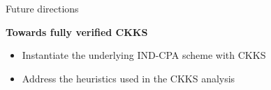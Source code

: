\begin{frame}{Future directions}
  \relax
  {\Large\bfseries\color{MendingTeal}Towards fully verified CKKS\par}
  \vspace{1em}
  \begin{itemize}
    \setlength{\itemsep}{0.8em}
    \item Instantiate the underlying IND-CPA scheme with CKKS
    \item Address the heuristics used in the CKKS analysis
  \end{itemize}
\end{frame}
